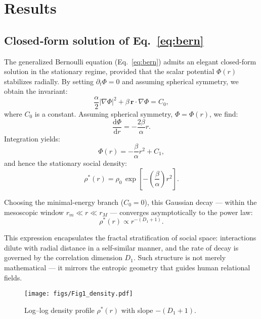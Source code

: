 
\section{Results}\label{sec:results}

\subsection{Closed‑form solution of Eq.~\ref{eq:bern}}

The generalized Bernoulli equation (Eq.~\ref{eq:bern}) admits an elegant closed-form solution in the stationary regime, provided that the scalar potential \(\Phi(r)\) stabilizes radially. By setting \(\partial_t\Phi = 0\) and assuming spherical symmetry, we obtain the invariant:
\begin{equation}
\frac{\alpha}{2}\left|\nabla\Phi\right|^{2} + \beta\,\mathbf{r}\cdot\nabla\Phi = C_0, \label{eq:bern_results}
\end{equation}
where \(C_0\) is a constant.
Assuming spherical symmetry, \(\Phi = \Phi(r)\), we find:
\[
\frac{\mathrm{d}\Phi}{\mathrm{d}r} = -\frac{2\beta}{\alpha}r.
\]
Integration yields:
\[
\Phi(r) = -\frac{\beta}{\alpha}r^2 + C_1,
\]
and hence the stationary social density:
\begin{equation}
\rho^\ast(r) = \rho_0\,\exp\!\left[-\left(\frac{\beta}{\alpha}\right)r^2\right].
\end{equation}

Choosing the minimal-energy branch (\(C_0 = 0\)), this Gaussian decay — within the mesoscopic window \(r_m \ll r \ll r_M\) — converges asymptotically to the power law:
\begin{equation}
\rho^\ast(r) \propto r^{-(D_1 + 1)}.
\end{equation}

This expression encapsulates the fractal stratification of social space: interactions dilute with radial distance in a self-similar manner, and the rate of decay is governed by the correlation dimension \(D_1\). Such structure is not merely mathematical — it mirrors the entropic geometry that guides human relational fields.

\begin{figure}[ht]
  \centering
  \texttt{[image: figs/Fig1\_density.pdf]}
  \caption{Log–log density profile $\rho^\ast(r)$ with slope $-(D_1+1)$.}
  \label{fig:density}
\end{figure}

